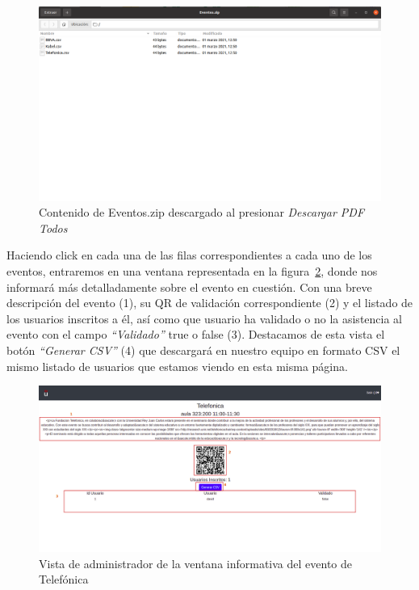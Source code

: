 \documentclass[a4paper, 12pt]{book}
\begin{document}
\begin{enumerate}
	\begin{figure}[h!]
  	\centering
  	\includegraphics[width=16cm, keepaspectratio]{img/AdminEventosZip.png}
  	\caption{Contenido de Eventos.zip descargado al presionar \textit{Descargar PDF Todos}}\label{fig:AdminEventosZip}
	\end{figure}
	
	 
	Haciendo click en cada una de las filas correspondientes a cada uno de los eventos, entraremos en una ventana representada en la figura~\ref{fig:adminListaEventoTelefonica}, donde nos informará más detalladamente sobre el evento en cuestión. Con una breve descripción del evento (1), su QR de validación correspondiente (2) y el listado de los usuarios inscritos a él, así como que usuario ha validado o no la asistencia al evento con el campo \textit{``Validado''} true o false (3). Destacamos de esta vista el botón \textit{``Generar CSV''} (4) que descargará en nuestro equipo en formato CSV el mismo listado de usuarios que estamos viendo en esta misma página.
	
	\begin{figure}[h!]
  	\centering
  	\includegraphics[width=16cm, keepaspectratio]{img/adminListaEventoTelefonica.png}
  	\caption{Vista de administrador de la ventana informativa del evento de Telefónica}\label{fig:adminListaEventoTelefonica}
	\end{figure}



\end{enumerate}
\end{document}
